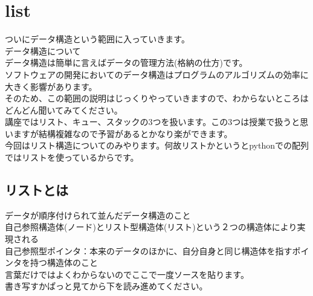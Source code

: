 \section{list}
ついにデータ構造という範囲に入っていきます。\\
データ構造について\\
データ構造は簡単に言えばデータの管理方法(格納の仕方)です。\\
ソフトウェアの開発においてのデータ構造はプログラムのアルゴリズムの効率に大きく影響があります。\\
そのため、この範囲の説明はじっくりやっていきますので、わからないところはどんどん聞いてみてください。\\
講座ではリスト、キュー、スタックの3つを扱います。この3つは授業で扱うと思いますが結構複雑なので予習があるとかなり楽ができます。\\
今回はリスト構造についてのみやります。何故リストかというとpythonでの配列ではリストを使っているからです。\\
\subsection{リストとは}
データが順序付けられて並んだデータ構造のこと\\
自己参照構造体(ノード)とリスト型構造体(リスト)という２つの構造体により実現される\\
自己参照型ポインタ：本来のデータのほかに、自分自身と同じ構造体を指すポインタを持つ構造体のこと\\
言葉だけではよくわからないのでここで一度ソースを貼ります。\\
書き写すかぱっと見てから下を読み進めてください。


